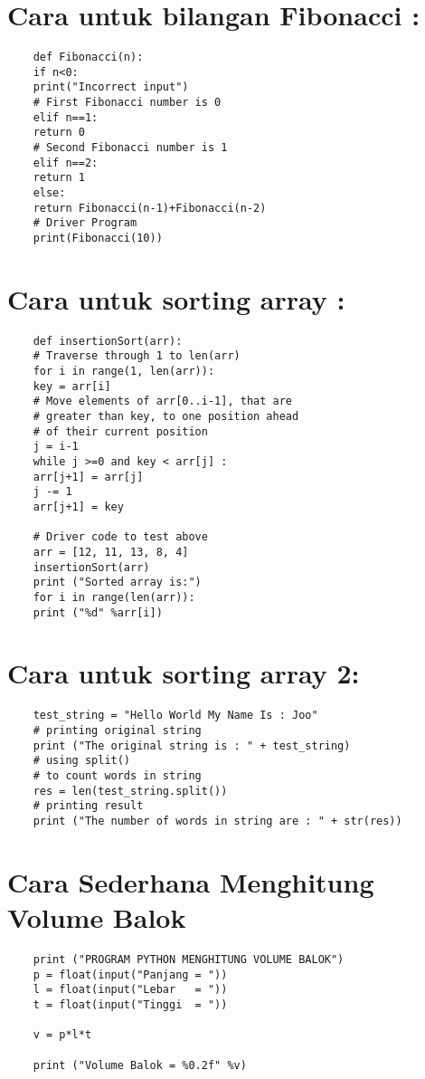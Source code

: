 \documentclass{article}
\begin{document}
\section {Cara untuk bilangan Fibonacci : }
\begin{lstlisting}
	def Fibonacci(n):
	if n<0:
	print("Incorrect input")
	# First Fibonacci number is 0
	elif n==1:
	return 0
	# Second Fibonacci number is 1
	elif n==2:
	return 1
	else:
	return Fibonacci(n-1)+Fibonacci(n-2)
	# Driver Program
	print(Fibonacci(10)) 
\end{lstlisting}

\section {Cara untuk sorting array :}
\begin{lstlisting}
	def insertionSort(arr):
	# Traverse through 1 to len(arr)
	for i in range(1, len(arr)):
	key = arr[i]
	# Move elements of arr[0..i-1], that are
	# greater than key, to one position ahead
	# of their current position
	j = i-1
	while j >=0 and key < arr[j] :
	arr[j+1] = arr[j]
	j -= 1
	arr[j+1] = key
	
	# Driver code to test above
	arr = [12, 11, 13, 8, 4]
	insertionSort(arr)
	print ("Sorted array is:")
	for i in range(len(arr)):
	print ("%d" %arr[i]) 
\end{lstlisting}

\section {Cara untuk sorting array 2:}
\begin{lstlisting}
	test_string = "Hello World My Name Is : Joo"
	# printing original string
	print ("The original string is : " + test_string)
	# using split()
	# to count words in string
	res = len(test_string.split())
	# printing result
	print ("The number of words in string are : " + str(res)) 
\end{lstlisting}

\section {Cara Sederhana Menghitung Volume Balok}
\begin{lstlisting}
	print ("PROGRAM PYTHON MENGHITUNG VOLUME BALOK")
	p = float(input("Panjang = "))
	l = float(input("Lebar   = "))
	t = float(input("Tinggi  = "))
	
	v = p*l*t
	
	print ("Volume Balok = %0.2f" %v)
\end{lstlisting}
\end{document}
